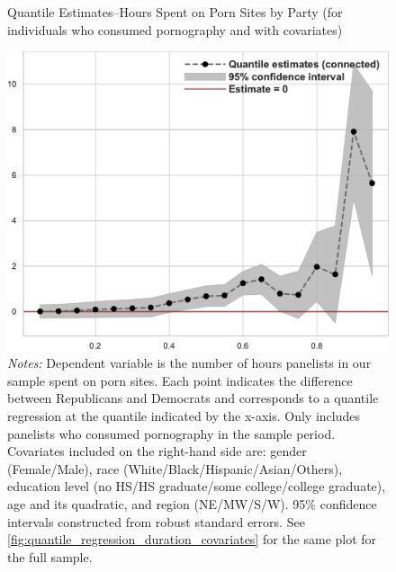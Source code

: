 \documentclass[12pt, letterpaper]{article}
\begin{document}
\begin{figure}[ht]
	\centering
	\caption{Quantile Estimates--Hours Spent on Porn Sites by Party (for individuals who consumed pornography and with covariates)}
	\includegraphics[width=.55\linewidth]{../figs/quantile_reg_nonzero_covariates_duration_adult.pdf}
	\caption*{\footnotesize \emph{Notes:} 
		Dependent variable is the number of hours panelists in our sample spent on porn sites.
		Each point indicates the difference between Republicans and Democrats and corresponds to a quantile regression at the quantile indicated by the x-axis.
		Only includes panelists who consumed pornography in the sample period.
		Covariates included on the right-hand side are: gender (Female/Male), race (White/Black/Hispanic/Asian/Others), education level (no HS/HS graduate/some college/college graduate), age and its quadratic, and region (NE/MW/S/W).
		95\% confidence intervals constructed from robust standard errors.
		See \cref{fig:quantile_regression_duration_covariates} for the same plot for the full sample.
	}
	\label{fig:quantile_regression_duration_nonzeroes_covariates}
\end{figure}
\end{document}
